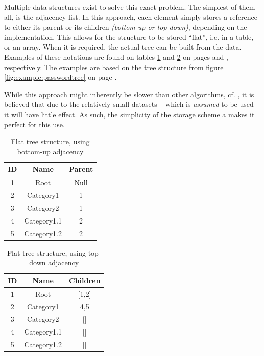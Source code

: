 			Multiple data structures exist to solve this exact problem. The simplest of them all, is the adjacency list. In this approach, each element simply stores a reference to either its parent or its children \emph{(bottom-up or top-down)}, depending on the implementation. This allows for the structure to be stored ``flat'', i.e. in a table, or an array. When it is required, the actual tree can be built from the data. Examples of these notations are found on tables \ref{table:example:tree:buttomup} and \ref{table:example:tree:topdown} on pages \pageref{table:example:tree:buttomup} and \pageref{table:example:tree:topdown}, respectively. The examples are based on the tree structure from figure \ref{fig:example:passwordtree} on page \pageref{fig:example:passwordtree}.

			While this approach might inherently be slower than other algorithms, cf. \cite{heirarchial_database}, it is believed that due to the relatively small datasets -- which is \emph{assumed} to be used -- it will have little effect. As such, the simplicity of the storage scheme a makes it perfect for this use.

			\begin{table}[p]
				\centering
				\begin{tabular}{c|c|c}
					\textbf{ID} 	& 	\textbf{Name} 	& \textbf{Parent} 	\\
					\hline
					\hline
					1 				& Root 				& Null 				\\
					2 				& Category1 		& 1 				\\
					3 				& Category2 		& 1 				\\
					4 				& Category1.1 		& 2 				\\
					5 				& Category1.2 		& 2 				\\
				\end{tabular}
				\caption{Flat tree structure, using bottom-up adjacency}
				\label{table:example:tree:buttomup}
			\end{table}
			\begin{table}[p]
				\centering
				\begin{tabular}{c|c|c}
					\textbf{ID} 	& 	\textbf{Name} 	& \textbf{Children} \\
					\hline
					\hline
					1 				& Root 				& [1,2] 			\\
					2 				& Category1 		& [4,5] 			\\
					3 				& Category2 		& [] 				\\
					4 				& Category1.1 		& [] 				\\
					5 				& Category1.2 		& [] 				\\
				\end{tabular}
				\caption{Flat tree structure, using top-down adjacency}
				\label{table:example:tree:topdown}
			\end{table}


